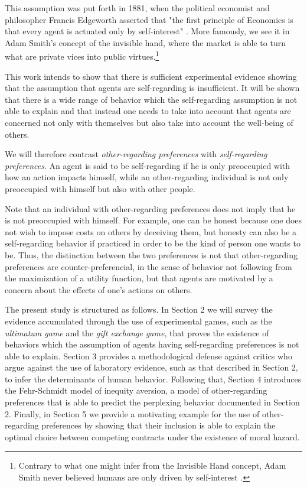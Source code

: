 \documentclass[12pt]{article}
\begin{document}
This assumption was put forth in 1881, when the political economist and philosopher Francis Edgeworth asserted that "the first principle of Economics is that every agent is actuated only by self-interest" \citep{edgeworth1881mathematical}. More famously, we see it in Adam Smith's concept of the invisible hand, where the market is able to turn what are private vices into public virtues.\footnote{Contrary to what one might infer from the Invisible Hand concept, Adam Smith never believed humans are only driven by self-interest \citep{smith1822theory}.} 

This work intends to show that there is sufficient experimental evidence showing that the assumption that agents are self-regarding is insufficient. It will be shown that there is a wide range of behavior which the self-regarding assumption is not able to explain and that instead one needs to take into account that agents are concerned not only with themselves but also take into account the well-being of others.

We will therefore contrast \textit{other-regarding preferences} with \textit{self-regarding preferences}. An agent is said to be self-regarding if he is only preoccupied with how an action impacts himself, while an other-regarding individual is not only preoccupied with himself but also with other people. 

Note that an individual with other-regarding preferences does not imply that he is not preoccupied with himself. For example, one can be honest because one does not wish to impose costs on others by deceiving them, but honesty can also be a self-regarding behavior if practiced in order to be the kind of person one wants to be. Thus, the distinction between the two preferences is not that other-regarding preferences are counter-preferencial, in the sense of behavior not following from the maximization of a utility function, but that agents are motivated by a concern about the effects of one's actions on others.

The present study is structured as follows. In Section 2 we will survey the evidence accumulated through the use of experimental games, such as the \textit{ultimatum game} and the \textit{gift exchange game}, that proves the existence of behaviors which the assumption of agents having self-regarding preferences is not able to explain. Section 3 provides a methodological defense against critics who argue against the use of laboratory evidence, such as that described in Section 2, to infer the determinants of human behavior. Following that, Section 4 introduces the Fehr-Schmidt model of inequity aversion, a model of other-regarding preferences that is able to predict the perplexing behavior documented in Section 2. Finally, in Section 5 we provide a motivating example for the use of other-regarding preferences by showing that their inclusion is able to explain the optimal choice between competing contracts under the existence of moral hazard.  
\end{document}
